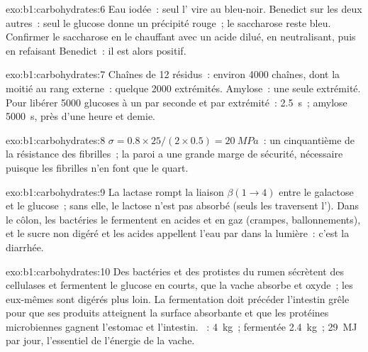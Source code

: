 \begin{solution}{exo:b1:carbohydrates:6}
Eau iodée~: seul l' vire au bleu-noir. Benedict sur les deux
autres~: seul le glucose donne un précipité rouge~; le saccharose reste
bleu. Confirmer le saccharose en le chauffant avec un acide dilué, en
neutralisant, puis en refaisant Benedict~: il est alors positif.
\end{solution}

\begin{solution}{exo:b1:carbohydrates:7}
Chaînes de 12 résidus~: environ \num{4000} chaînes, dont la moitié au
rang externe~: quelque \num{2000} extrémités. Amylose~: une seule
extrémité. Pour libérer \num{5000} glucoses à un par seconde et par
extrémité~:  \qty{2.5}{s}~; amylose \qty{5000}{s}, près d'une
heure et demie.
\end{solution}

\begin{solution}{exo:b1:carbohydrates:8}
$\sigma = 0.8\times 25/(2\times 0.5) = \qty{20}{MPa}$~: un cinquantième
de la résistance des fibrilles~; la paroi a une grande marge de
sécurité, nécessaire puisque les fibrilles n'en font que le quart.
\end{solution}

\begin{solution}{exo:b1:carbohydrates:9}
La lactase rompt la liaison $\beta(1{\to}4)$ entre le galactose et le
glucose~; sans elle, le lactose n'est pas absorbé (seuls les
 traversent l'). Dans le côlon, les bactéries
le fermentent en acides et en gaz (crampes, ballonnements), et le sucre
non digéré et les acides appellent l'eau par  dans la lumière~:
c'est la diarrhée.
\end{solution}

\begin{solution}{exo:b1:carbohydrates:10}
Des bactéries et des protistes du rumen sécrètent des cellulases et
fermentent le glucose en  courts, que la vache absorbe et
oxyde~; les  eux-mêmes sont digérés plus loin. La
fermentation doit précéder l'intestin grêle pour que ses produits
atteignent la surface absorbante et que les protéines microbiennes
gagnent l'estomac et l'intestin. ~: \qty{4}{kg}~; fermentée
\qty{2.4}{kg}~; \qty{29}{MJ} par jour, l'essentiel de l'énergie de la
vache.
\end{solution}

